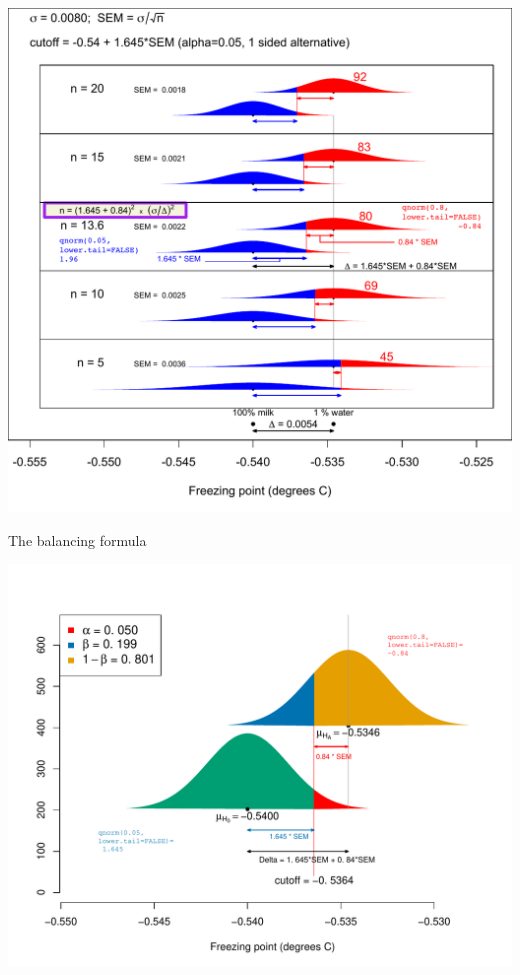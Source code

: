 \documentclass{beamer}\usepackage[]{graphicx}\usepackage[]{color}
\newenvironment{knitrout}{}{} %
\begin{document}
\begin{frame}
\begin{center}
	\includegraphics[scale=0.5]{../sample_size/SampleSize1pctWaterAdded.pdf} 
\end{center}
\end{frame}

\begin{frame}[fragile]{The balancing formula}
\begin{knitrout}\scriptsize
{}\color{fgcolor}

{\centering \includegraphics[width=1\linewidth]{figure/unnamed-chunk-15-1} 

}



\end{knitrout}
\end{frame}
\end{document}
